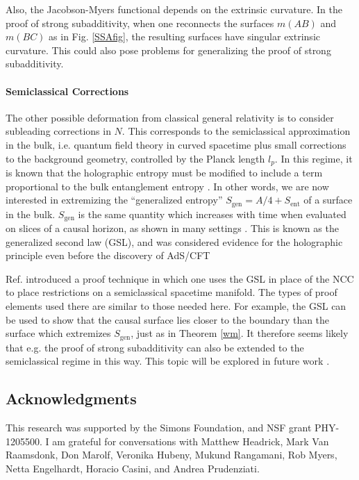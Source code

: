 \documentclass[12pt]{article}
\begin{document}
Also, the Jacobson-Myers functional depends on the extrinsic curvature.  In the proof of strong subadditivity, when one reconnects the surfaces $m(AB)$ and $m(BC)$ as in Fig. \ref{SSAfig}, the resulting surfaces have singular extrinsic curvature.  This could also pose problems for generalizing the proof of strong subadditivity.

\paragraph{Semiclassical Corrections}

The other possible deformation from classical general relativity is to consider subleading corrections in $N$.  This corresponds to the semiclassical approximation in the bulk, i.e. quantum field theory in curved spacetime plus small corrections to the background geometry, controlled by the Planck length $l_p$.  In this regime, it is known that the holographic entropy must be modified to include a term proportional to the bulk entanglement entropy \cite{FLM13, SR, BDHM}.  In other words, we are now interested in extremizing the ``generalized entropy'' $S_\mathrm{gen} = A/4 + S_\mathrm{ent}$ of a surface in the bulk.  $S_\mathrm{gen}$ is the same quantity which increases with time when evaluated on slices of a causal horizon, as shown in many settings \cite{10proofs,null}.  This is known as the generalized second law (GSL), and was considered evidence for the holographic principle even before the discovery of AdS/CFT \cite{susskind94}

Ref. \cite{sing} introduced a proof technique in which one uses the GSL in place of the NCC to place restrictions on a semiclassical spacetime manifold.  The types of proof elements used there are similar to those needed here.  For example, the GSL can be used to show that the causal surface lies closer to the boundary than the surface which extremizes $S_\mathrm{gen}$, just as in Theorem \ref{wm}.  It therefore seems likely that e.g. the proof of strong subadditivity can also be extended to the semiclassical regime in this way.  This topic will be explored in future work \cite{NW}.

\subsection*{Acknowledgments}
This research was supported by the Simons Foundation, and NSF grant PHY-1205500.  I am grateful for conversations with Matthew Headrick, Mark Van Raamsdonk, Don Marolf, Veronika Hubeny, Mukund Rangamani, Rob Myers, Netta Engelhardt, Horacio Casini, and Andrea Prudenziati.
\end{document}
